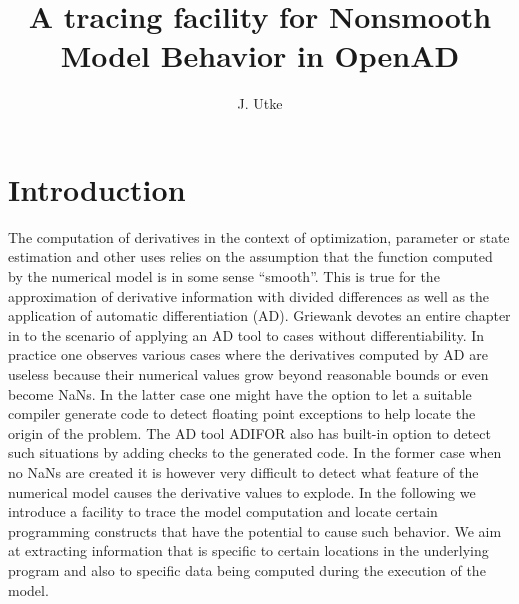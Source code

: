 \documentclass{article}
\title{A tracing facility for Nonsmooth Model Behavior in OpenAD}
\author{J. Utke}
\date{ }
\begin{document}
\maketitle
{}
\lstset{basicstyle=\footnotesize\tt, 
	numbers=left, 
	numberstyle=\scriptsize,
  	stepnumber=1, 
	numbersep=10pt, 
	breaklines=true,
	resetmargins=false,
	xleftmargin=6ex,
	columns=fullflexible}
\section{Introduction}

The computation of derivatives in the context of optimization, parameter or state estimation 
and other uses relies on the assumption that the function computed by the numerical 
model is in some sense ``smooth''. 
This is true for the approximation of derivative information with divided differences 
as well as the application of automatic differentiation (AD). 
Griewank devotes an entire chapter in \cite{Gri00} 
to the scenario of applying an AD tool to cases without differentiability. 
In practice one observes various cases where the derivatives computed by AD are useless 
because their numerical values grow  beyond reasonable bounds \cite{bischof} or even 
become NaNs. 
In the latter case one might have the option to let a suitable compiler generate 
code to detect floating point exceptions to help locate the origin of the problem.
The AD  tool ADIFOR \cite{adifor} also has built-in  option to detect 
such situations by adding checks to the generated code.   
In the former case when no NaNs are created it is however very difficult to 
detect what feature of the numerical model causes the derivative values to explode. 
In the following we introduce a facility to trace the model computation and locate 
certain programming constructs that have the potential to cause 
such behavior. We aim at extracting information that is specific to 
certain locations in the underlying program and also to specific data 
being computed during the execution of the model.  
   
\end{document}
